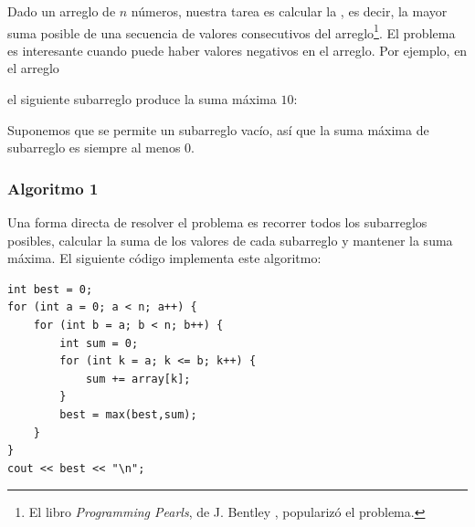 Dado un arreglo de $n$ números,
nuestra tarea es calcular la
, es decir,
la mayor suma posible de
una secuencia de valores consecutivos
del arreglo\footnote{El libro \emph{Programming Pearls},
de J. Bentley \cite{ben86}, popularizó el problema.}.
El problema es interesante cuando puede haber
valores negativos en el arreglo.
Por ejemplo, en el arreglo
\begin{center}
\end{center}
\begin{samepage}
el siguiente subarreglo produce la suma máxima $10$:
\begin{center}
\end{center}
\end{samepage}

Suponemos que se permite un subarreglo vacío,
así que la suma máxima de subarreglo es siempre al menos $0$.

\subsubsection{Algoritmo 1}

Una forma directa de resolver el problema
es recorrer todos los subarreglos posibles,
calcular la suma de los valores de cada subarreglo y mantener
la suma máxima.
El siguiente código implementa este algoritmo:

\begin{lstlisting}
int best = 0;
for (int a = 0; a < n; a++) {
    for (int b = a; b < n; b++) {
        int sum = 0;
        for (int k = a; k <= b; k++) {
            sum += array[k];
        }
        best = max(best,sum);
    }
}
cout << best << "\n";
\end{lstlisting}

